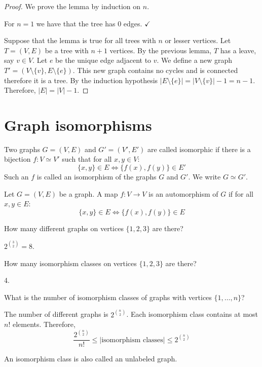 \begin{proof}
We prove the lemma by induction on $n$.

For $n=1$ we have that the tree has 0 edges. $\checkmark$

Suppose that the lemma is true for all trees with $n$ or lesser vertices. Let $T=(V,E)$ be a tree with $n+1$ vertices. By the previous lemma, $T$ has a leave, say $v\in V$. Let $e$ be the unique edge adjacent to $v$. We define a new graph $T'=(V\setminus \{ v \},E\setminus \{ e \})$. This new graph contains no cycles and is connected therefore it is a tree. By the induction hypothesis $|E\setminus \{ e \}|=|V\setminus \{ v \}|-1=n-1$. Therefore, $|E|=|V|-1$.
\end{proof}
\section{Graph isomorphisms}

\begin{definition}
Two graphs $G=(V,E)$ and $G'=(V',E')$ are called isomorphic if there is a bijection $f:V\simeq V'$ such that for all $x,y\in V$:
$$
\{ x,y \}\in E\Leftrightarrow \{ f(x),f(y) \}\in E'
$$
Such an $f$ is called an isomorphism of the graphs $G$ and $G'$. We write $G\simeq G'$.
\end{definition}
\begin{definition}
Let $G=(V,E)$ be a graph. A map $f:V\to V$ is an automorphism of $G$ if for all $x,y\in E$:
$$
\{ x,y \}\in E\Leftrightarrow \{ f(x),f(y) \}\in E
$$
\end{definition}
\begin{question}
How many different graphs on vertices $\{ 1,2,3 \}$ are there?
\end{question}
\begin{answer}
$2^{\binom{ 3}  {2 }}=8$.
\end{answer}
\begin{question}
How many isomorphism classes on vertices $\{ 1,2,3 \}$ are there?
\end{question}
\begin{answer}
4.
\end{answer}

\begin{question}
What is the number of isomorphism classes of graphs with vertices $\{ 1,\dots,n \}$?
\end{question}
\begin{answer}
The number of different graphs is $2^{\binom{ n}  {2 }}$. Each isomorphism class contains at most $n!$ elements. Therefore,
$$
\frac{2^{\binom{ n}  {2 } }}{n!}\le |\text{isomorphism classes}|\le 2^{\binom{ n}  {2 } }
$$
\end{answer}
\begin{notation}
An isomorphism class is also called an unlabeled graph.
\end{notation}
